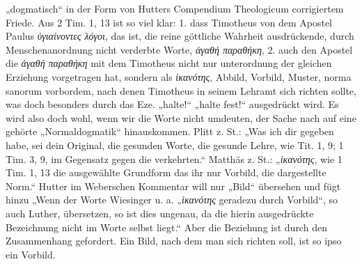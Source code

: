 „dogmatisch“ in der Form von Hutters Compendium Theologicum corrigiertem Friede. Aus 2 Tim. 1, 13 ist so viel klar: 1. dass Timotheus von dem Apostel Paulus \textit{ὑγιαίνοντες λόγοι}, das ist, die reine göttliche Wahrheit ausdrückende, durch Menschenanordnung nicht verderbte Worte, \textit{ἀγαθή παραθήκη}, 2. auch den Apostel die \textit{ἀγαθή παραθήκη} mit dem Timotheus nicht nur unterordnung der gleichen Erziehung vorgetragen hat, sondern als \textit{ἱκανότης}, Abbild, Vorbild, Muster, norma sanorum vorbordem, nach denen Timotheus in seinem Lehramt sich richten sollte, was doch besonders durch das Eze. „halte!“ „halte fest!“ ausgedrückt wird. Es wird also doch wohl, wenn wir die Worte nicht umdeuten, der Sache nach auf eine gehörte „Normaldogmatik“ hinauskommen. Plitt z. St.: „Was ich dir gegeben habe, sei dein Original, die gesunden Worte, die gesunde Lehre, wie Tit. 1, 9; 1 Tim. 3, 9, im Gegensatz gegen die verkehrten.“ Matthäs z. St.: „\textit{ἱκανότης}, wie 1 Tim. 1, 13 die ausgewählte Grundform das ihr nur Vorbild, die dargestellte Norm.“ Hutter im Weberschen Kommentar will nur „Bild“ übersehen und fügt hinzu „Wenn der Worte Wiesinger u. a. „\textit{ἱκανότης} geradezu durch Vorbild“, so auch Luther, übersetzen, so ist dies ungenau, da die hierin ausgedrückte Bezeichnung nicht im Worte selbst liegt.“ Aber die Beziehung ist durch den Zusammenhang gefordert. Ein Bild, nach dem man sich richten soll, ist so ipso ein Vorbild.

